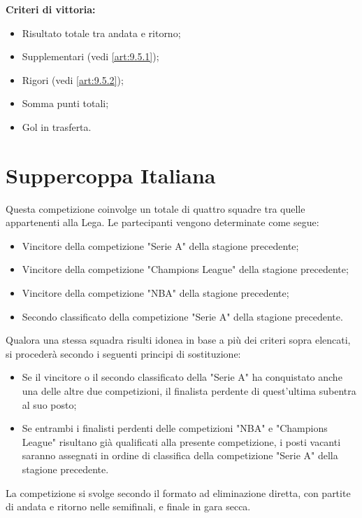 \noindent \textbf{Criteri di vittoria:}
\begin{itemize}
\item Risultato totale tra andata e ritorno;
\item Supplementari (vedi \ref{art:9.5.1});
\item Rigori (vedi \ref{art:9.5.2});
\item Somma punti totali;
\item Gol in trasferta.
\end{itemize}


\section{Suppercoppa Italiana}
\label{art:9.4}
Questa competizione coinvolge un totale di quattro squadre tra quelle appartenenti alla Lega. Le partecipanti vengono determinate come segue:

\begin{itemize}
    \item Vincitore della competizione "Serie A" della stagione precedente;
    \item Vincitore della competizione "Champions League" della stagione precedente;
    \item Vincitore della competizione "NBA" della stagione precedente;
    \item Secondo classificato della competizione "Serie A" della stagione precedente.
\end{itemize}

\noindent
Qualora una stessa squadra risulti idonea in base a più dei criteri sopra elencati, si procederà secondo i seguenti principi di sostituzione:

\begin{itemize}
    \item Se il vincitore o il secondo classificato della "Serie A" ha conquistato anche una delle altre due competizioni, il finalista perdente di quest'ultima subentra al suo posto;
    \item Se entrambi i finalisti perdenti delle competizioni "NBA" e "Champions League" risultano già qualificati alla presente competizione, i posti vacanti saranno assegnati in ordine di classifica della competizione "Serie A" della stagione precedente.
\end{itemize}

\vspace{0.5em}
La competizione si svolge secondo il formato ad eliminazione diretta, con partite di andata e ritorno nelle semifinali, e finale in gara secca.

